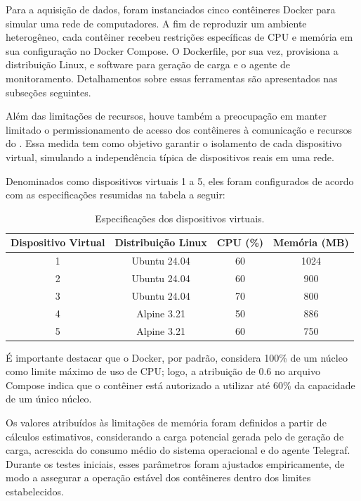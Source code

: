 Para a aquisição de dados, foram instanciados cinco contêineres Docker para simular uma rede de computadores. A fim de reproduzir um ambiente heterogêneo, cada contêiner recebeu restrições específicas de CPU e memória em sua configuração no Docker Compose. O Dockerfile, por sua vez, provisiona a distribuição Linux,  e software para geração de carga e o agente de monitoramento. Detalhamentos sobre essas ferramentas são apresentados nas subseções seguintes.

Além das limitações de recursos, houve também a preocupação em manter limitado o permissionamento de acesso dos contêineres à comunicação e recursos do . Essa medida tem como objetivo garantir o isolamento de cada dispositivo virtual, simulando a independência típica de dispositivos reais em uma rede.

Denominados como dispositivos virtuais 1 a 5, eles foram configurados de acordo com as especificações resumidas na tabela a seguir:

\begin{table}[h]
\centering
\caption{Especificações dos dispositivos virtuais.}
\label{tab:EspecificaçõesDispositivosVirtuais}
\begin{tabular}{c c c c}
\hline
\textbf{Dispositivo Virtual} & \textbf{Distribuição Linux} & \textbf{CPU (\%)} & \textbf{Memória (MB)} \\
\hline
1 & Ubuntu 24.04 & 60 & 1024 \\
2 & Ubuntu 24.04 & 60 & 900 \\
3 & Ubuntu 24.04 & 70 & 800 \\
4 & Alpine 3.21 & 50 & 886 \\
5 & Alpine 3.21 & 60 & 750 \\
\hline
\end{tabular}
\end{table}

É importante destacar que o Docker, por padrão, considera 100\% de um núcleo como limite máximo de uso de CPU; logo, a atribuição de 0.6 no arquivo Compose indica que o contêiner está autorizado a utilizar até 60\% da capacidade de um único núcleo.

Os valores atribuídos às limitações de memória foram definidos a partir de cálculos estimativos, considerando a carga potencial gerada pelo  de geração de carga, acrescida do consumo médio do sistema operacional e do agente Telegraf. Durante os testes iniciais, esses parâmetros foram ajustados empiricamente, de modo a assegurar a operação estável dos contêineres dentro dos limites estabelecidos.

